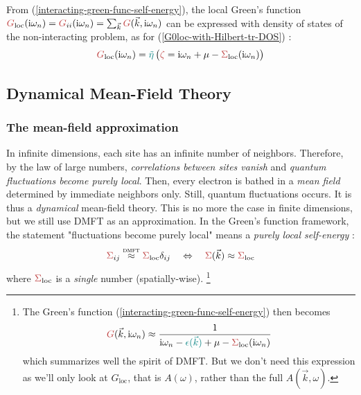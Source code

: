 \documentclass[reprint,amsmath,amssymb,aps,pra]{revtex4-2}
\newcommand{\mathi}{\mathrm{i}}
\newcommand{\tmname}[1]{\textsc{#1}}
\newcommand{\iwn}{\mathrm{i}\omega_n}
\begin{document}
From (\ref{interacting-green-func-self-energy}), the local Green's
function ${\color[HTML]{BF4040}G}_{\text{loc}} (\iwn) =
{\color[HTML]{BF4040}G}_{i i} (\iwn) = \smash{\sum_{\vec{k}}{\color[HTML]{BF4040}G} (\vec{k}, \iwn)}$ can be
expressed with density of states of the non-interacting
problem, as for (\ref{G0loc-with-Hilbert-tr-DOS}) :
\begin{equation}
    {\color[HTML]{BF4040}G}_{\text{loc}} (\iwn) =
    {\color[HTML]{008080}\tilde{\eta}}\, \big({\color[HTML]{BF4040}\zeta} = \mathi
    \omega_n + \mu - {\color[HTML]{BF4040}\Sigma}_{\text{loc}} (\iwn)\big)
\label{Gloc-with-Hilbert-tr-DOS}
\end{equation}

\subsection{Dynamical Mean-Field Theory}

\subsubsection{The mean-field approximation}

In infinite dimensions, each site has an infinite number of neighbors. Therefore, by the law of large numbers, \emph{correlations between sites vanish} and \emph{quantum fluctuations become purely local}. Then, every electron is bathed in a \emph{mean field} determined by immediate neighbors only. Still, quantum fluctuations occurs. It is thus a \emph{dynamical} mean-field theory. This is no more the case in finite dimensions, but we still use DMFT as an approximation. In the Green's function framework, the statement "fluctuations become purely local" means a \emph{purely local self-energy} :
\begin{equation}
    {\color[HTML]{BF4040}\Sigma}_{i j} 
    \overset{\text{{\tmname{dmft}}}}{\approx} 
    {\color[HTML]{BF4040}\Sigma}_{\text{loc}} \delta_{i j}\\
    \quad \Leftrightarrow \quad {\color[HTML]{BF4040}\Sigma}
  (\vec{k})  \approx {\color[HTML]{BF4040}\Sigma}_{\text{loc}}
  \label{DMFT-local-approx}
\end{equation}
where ${\color[HTML]{BF4040}\Sigma}_{\text{loc}}$ is a \emph{single} number (spatially-wise). \footnote{The Green's function (\ref{interacting-green-func-self-energy}) then becomes \begin{equation*}
{\color[HTML]{BF4040}G} (\vec{k}, \iwn) \approx \frac{1}{\iwn - {\color[HTML]{008080}\epsilon (\vec{k})} + \mu - {\color[HTML]{BF4040}\Sigma}_{\text{loc}} (\iwn)}\end{equation*}
which summarizes well the spirit of DMFT. But we don't need this expression as we'll only look at $G_\text{loc}$, that is $A(\omega)$, rather than the full $A(\vec{k},\omega)$.}
\end{document}
